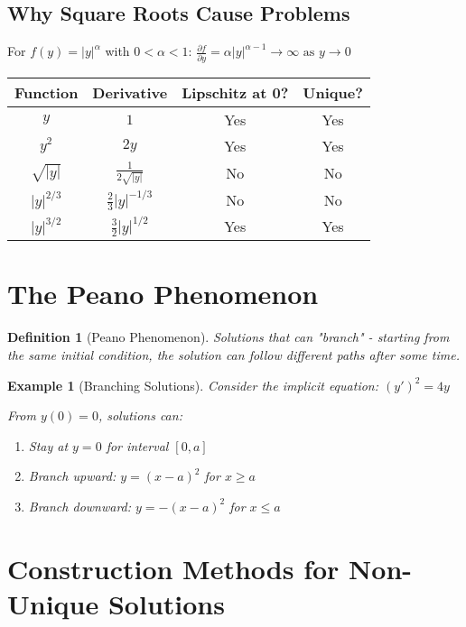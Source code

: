 \documentclass[12pt]{article}
\newtheorem{definition}{Definition}
\newtheorem{example}{Example}
\begin{document}
\subsection{Why Square Roots Cause Problems}

For $f(y) = |y|^\alpha$ with $0 < \alpha < 1$:
$\frac{\partial f}{\partial y} = \alpha |y|^{\alpha-1} \rightarrow \infty \text{ as } y \rightarrow 0$

\begin{table}[h]
\centering
\begin{tabular}{|c|c|c|c|}
\hline
\textbf{Function} & \textbf{Derivative} & \textbf{Lipschitz at 0?} & \textbf{Unique?} \\
\hline
$y$ & $1$ & Yes & Yes \\
$y^2$ & $2y$ & Yes & Yes \\
$\sqrt{|y|}$ & $\frac{1}{2\sqrt{|y|}}$ & No & No \\
$|y|^{2/3}$ & $\frac{2}{3}|y|^{-1/3}$ & No & No \\
$|y|^{3/2}$ & $\frac{3}{2}|y|^{1/2}$ & Yes & Yes \\
\hline
\end{tabular}
\end{table}

\section{The Peano Phenomenon}

\begin{definition}[Peano Phenomenon]
Solutions that can "branch" - starting from the same initial condition, the solution can follow different paths after some time.
\end{definition}

\begin{example}[Branching Solutions]
Consider the implicit equation: $(y')^2 = 4y$

From $y(0) = 0$, solutions can:
\begin{enumerate}
    \item Stay at $y = 0$ for interval $[0,a]$
    \item Branch upward: $y = (x-a)^2$ for $x \geq a$
    \item Branch downward: $y = -(x-a)^2$ for $x \leq a$
\end{enumerate}
\end{example}

\section{Construction Methods for Non-Unique Solutions}
\end{document}
